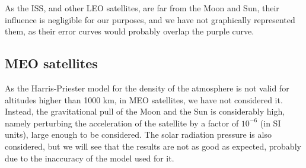 \documentclass[../main.tex]{subfiles}
\begin{document}
As the ISS, and other LEO satellites, are far from the Moon and Sun, their influence is negligible for our purposes, and we have not graphically represented them, as their error curves would probably overlap the purple curve.

\subsection{MEO satellites}
As the Harris-Priester model for the density of the atmosphere is not valid for altitudes higher than 1000 km, in MEO satellites, we have not considered it. Instead, the gravitational pull of the Moon and the Sun is considerably high, namely perturbing the acceleration of the satellite by a factor of $10^{-6}$ (in SI units), large enough to be considered. The solar radiation pressure is also considered, but we will see that the results are not as good as expected, probably due to the inaccuracy of the model used for it.
\end{document}
